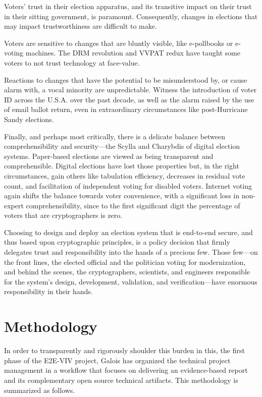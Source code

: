 Voters' trust in their election apparatus, and its transitive impact on
their trust in their sitting government, is paramount. Consequently,
changes in elections that may impact trustworthiness are difficult to
make.

Voters are sensitive to changes that are bluntly visible, like
e-pollbooks or e-voting machines. The DRM revolution and VVPAT redux
have taught some voters to not trust technology at face-value.

Reactions to changes that have the potential to be misunderstood by,
or cause alarm with, a vocal minority are unpredictable. Witness the
introduction of voter ID across the U.S.A. over the past decade, as
well as the alarm raised by the use of email ballot return, even in
extraordinary circumstances like post-Hurricane Sandy elections.

Finally, and perhaps most critically, there is a delicate balance
between comprehensibility and security---the Scylla and Charybdis of
digital election systems. Paper-based elections are viewed as being
transparent and comprehensible. Digital elections have lost those
properties but, in the right circumstances, gain others like
tabulation efficiency, decreases in residual vote count, and
facilitation of independent voting for disabled voters. Internet
voting again shifts the balance towards voter convenience, with a
significant loss in non-expert comprehensibility, since to the first
significant digit the percentage of voters that are cryptographers is
zero.

Choosing to design and deploy an election system that is end-to-end
secure, and thus based upon cryptographic principles, is a policy
decision that firmly delegates trust and responsibility into the hands
of a precious few.  Those few---on the front lines, the elected official
and the politician voting for modernization, and behind the scenes,
the cryptographers, scientists, and engineers responsible for the
system's design, development, validation, and verification---have
enormous responsibility in their hands.

\section{Methodology}

In order to transparently and rigorously shoulder this burden in this,
the first phase of the E2E-VIV project, Galois has organized the
technical project management in a workflow that focuses on delivering
an evidence-based report and its complementary open source technical
artifacts.  This methodology is summarized as follows.

